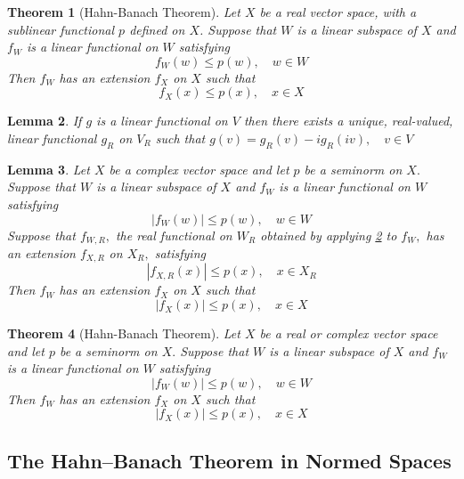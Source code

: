\documentclass[10pt]{paper}
\newtheorem{theorem}{Theorem}[section]
\newtheorem{lemma}[theorem]{Lemma}
\begin{document}
\begin{theorem}[Hahn-Banach Theorem]
    Let $X$ be a real vector space, with a sublinear functional $p$ defined on $X$. Suppose that $W$ is a linear subspace of $X$ and $f_{W}$ is a linear functional on $W$ satisfying
    $$
        f_{W}(w) \leq p(w), \quad w \in W
    $$
    Then $f_{W}$ has an extension $f_{X}$ on $X$ such that
    $$
        f_{X}(x) \leq p(x), \quad x \in X
    $$
\end{theorem}

\begin{lemma}\label{lf}
    If $g$ is a linear functional on $V$ then there exists a unique, real-valued, linear functional $g_{R}$ on $V_{R}$ such that $g(v)=g_{R}(v)-i g_{R}(i v), \quad v \in V$
\end{lemma}

\begin{lemma}
    Let $X$ be a complex vector space and let $p$ be a seminorm on $X .$ Suppose that $W$ is a linear subspace of $X$ and $f_{W}$ is a linear functional on $W$ satisfying
    $$
        \left|f_{W}(w)\right| \leq p(w), \quad w \in W
    $$
    Suppose that $f_{W, R},$ the real functional on $W_{R}$ obtained by applying \ref{lf} to $f_{W},$ has an extension $f_{X, R}$ on $X_{R},$ satisfying
    $$
        \left|f_{X, R}(x)\right| \leq p(x), \quad x \in X_{R}
    $$
    Then $f_{W}$ has an extension $f_{X}$ on $X$ such that
    $$
        \left|f_{X}(x)\right| \leq p(x), \quad x \in X
    $$
\end{lemma}

\begin{theorem}[Hahn-Banach Theorem]
    Let $X$ be a real or complex vector space and let $p$ be a seminorm on $X .$ Suppose that $W$ is a linear subspace of $X$ and $f_{W}$ is a linear functional on $W$ satisfying
    $$
        \left|f_{W}(w)\right| \leq p(w), \quad w \in W
    $$
    Then $f_{W}$ has an extension $f_{X}$ on $X$ such that
    $$
        \left|f_{X}(x)\right| \leq p(x), \quad x \in X
    $$
\end{theorem}

\subsection{The Hahn–Banach Theorem in Normed Spaces}
\end{document}
